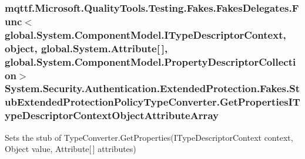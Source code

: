 \hypertarget{class_system_1_1_security_1_1_authentication_1_1_extended_protection_1_1_fakes_1_1_stub_extendedf67afed15bbc0df07bfc91316f6f81f0_a0ca81ee37a4d0f1feeb974c1d8382543}{
\subsubsection[{Get\-Properties\-I\-Type\-Descriptor\-Context\-Object\-Attribute\-Array}]{\setlength{\rightskip}{0pt plus 5cm}mqttf.\-Microsoft.\-Quality\-Tools.\-Testing.\-Fakes.\-Fakes\-Delegates.\-Func$<$global.\-System.\-Component\-Model.\-I\-Type\-Descriptor\-Context, object, global.\-System.\-Attribute\mbox{[}$\,$\mbox{]}, global.\-System.\-Component\-Model.\-Property\-Descriptor\-Collection$>$ System.\-Security.\-Authentication.\-Extended\-Protection.\-Fakes.\-Stub\-Extended\-Protection\-Policy\-Type\-Converter.\-Get\-Properties\-I\-Type\-Descriptor\-Context\-Object\-Attribute\-Array}}\label{class_system_1_1_security_1_1_authentication_1_1_extended_protection_1_1_fakes_1_1_stub_extendedf67afed15bbc0df07bfc91316f6f81f0_a0ca81ee37a4d0f1feeb974c1d8382543}


Sets the stub of Type\-Converter.\-Get\-Properties(\-I\-Type\-Descriptor\-Context context, Object value, Attribute\mbox{[}$\,$\mbox{]} attributes)

